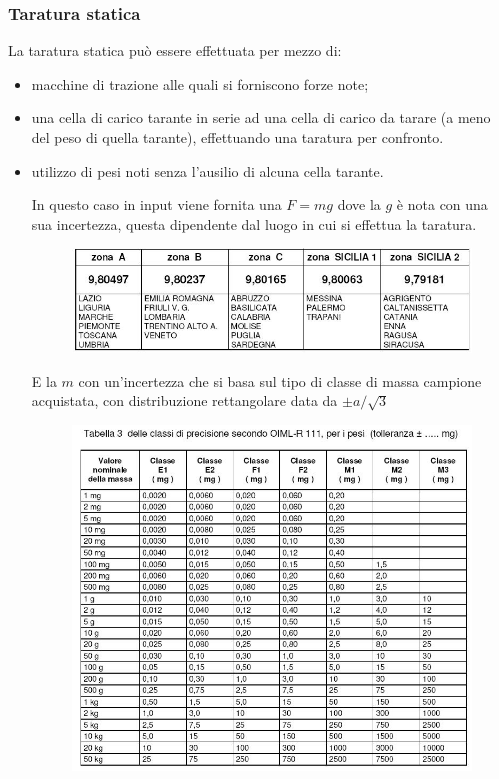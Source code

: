 \documentclass[a4paper, 15pt]{article}
\begin{document}
\subsubsection{Taratura statica}			
\begin{adjustwidth}{2in}{}
  		La taratura statica può essere effettuata per mezzo di:
  		\begin{itemize}
  			\item macchine di trazione alle quali si forniscono forze note;
  			\item una cella di carico tarante in serie ad una cella di carico da tarare (a meno del peso di quella tarante), effettuando una taratura per confronto. 
  			\item utilizzo di pesi noti senza l'ausilio di alcuna cella tarante.\newline 
  			
  			In questo caso in input viene fornita una $F=mg$ dove la $g$ è nota con una sua incertezza, questa dipendente dal luogo in cui si effettua la taratura.  			
  			\begin{figure}[H]
  				\centering
  				\includegraphics[width=0.6\linewidth]{immagini/24}
  				\label{fig:screenshot013}
  			\end{figure}  			  			
  			E la $m$ con un'incertezza che si basa sul tipo di classe di massa campione acquistata, con distribuzione rettangolare data da $\pm a/\sqrt{3}$ 
\begin{figure}[H]
	\centering
	\includegraphics[width=0.6\linewidth]{immagini/25}
	\label{fig:25}
\end{figure}
  		\end{itemize}
\end{adjustwidth}
\newpage
\end{document}
